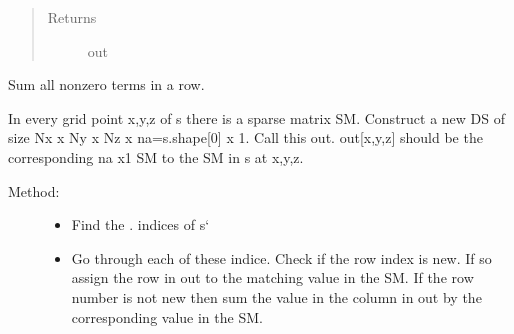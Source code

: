 \documentclass[letterpaper,10pt,english]{sphinxmanual}
\begin{document}
\begin{fulllineitems}
\begin{fulllineitems}
\begin{quote}
\begin{description}
\item[{Returns}] \leavevmode
out

\end{description}\end{quote}

\end{fulllineitems}


\begin{fulllineitems}
\label{index:DictionarySparseMatrix.DS.row_sum_withind}
Sum all nonzero terms in a row.

In every grid point x,y,z of s there is a sparse matrix SM.
Construct a new DS of size Nx x Ny x Nz x na=s.shape{[}0{]} x 1.
Call this out.
out{[}x,y,z{]} should be the corresponding na x1 SM to the SM in s at x,y,z.
\begin{description}
\item[{Method:}] \leavevmode\begin{itemize}
\item {} 
Find the {\hyperref[index:DictionarySparseMatrix.DS]{}}. {\hyperref[index:DictionarySparseMatrix.DS.nonzero]{}} indices of s{}`

\item {} 
Go through each of these indice. Check if the       row index is new. If so assign the row in out to the matching       value in the SM. If the row number is not new then sum the       value in the column in out by the corresponding value in the SM.

\end{itemize}

\end{description}


\end{fulllineitems}
\end{fulllineitems}
\end{document}
